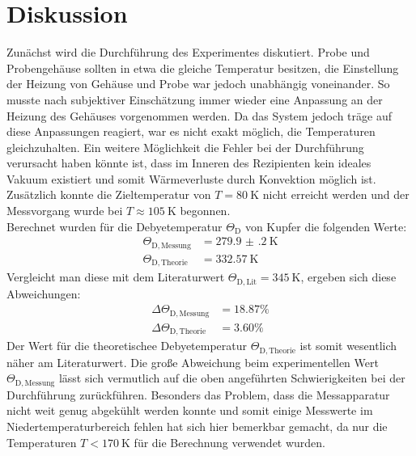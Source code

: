 \newpage
\section{Diskussion}
\label{sec:Diskussion}
Zunächst wird die Durchführung des Experimentes diskutiert. Probe und Probengehäuse sollten in etwa die gleiche Temperatur besitzen, die
Einstellung der Heizung von Gehäuse und Probe war jedoch unabhängig voneinander. So musste nach subjektiver Einschätzung immer wieder eine Anpassung an
der Heizung des Gehäuses vorgenommen werden. Da das System jedoch träge auf diese Anpassungen reagiert, war es nicht exakt möglich, die Temperaturen gleichzuhalten.
Ein weitere Möglichkeit die Fehler bei der Durchführung verursacht haben könnte ist, dass im Inneren des Rezipienten kein ideales Vakuum existiert und somit
Wärmeverluste durch Konvektion möglich ist. Zusätzlich konnte die Zieltemperatur von $T=\SI{80}{\kelvin}$ nicht erreicht werden und der Messvorgang wurde bei
$T\approx\SI{105}{\kelvin}$ begonnen. \\

\noindent Berechnet wurden für die Debyetemperatur $\Theta_\mathrm{D}$ von Kupfer die folgenden Werte:
\begin{align*}
  \Theta_\mathrm{D,Messung} &= \SI{279.9(2)}{\kelvin} \\
  \Theta_\mathrm{D,Theorie} &= \SI{332.57}{\kelvin}
\end{align*}
Vergleicht man diese mit dem Literaturwert \cite{Anleitung3} $\Theta_\mathrm{D,Lit}=\SI{345}{\kelvin}$, ergeben sich diese Abweichungen:
\begin{align*}
  \Delta\Theta_\mathrm{D,Messung} &= 18.87 \% \\
  \Delta\Theta_\mathrm{D,Theorie} &= 3.60 \%
\end{align*}
Der Wert für die theoretischee Debyetemperatur $\Theta_\mathrm{D,Theorie}$ ist somit wesentlich näher am Literaturwert. Die große Abweichung beim experimentellen Wert $\Theta_\mathrm{D,Messung}$
lässt sich vermutlich auf die oben angeführten Schwierigkeiten bei der Durchführung zurückführen. Besonders das Problem, dass die Messapparatur nicht weit genug abgekühlt werden konnte und somit einige Messwerte im Niedertemperaturbereich fehlen hat sich hier bemerkbar gemacht, da nur die Temperaturen $T<\SI{170}{\kelvin}$ für die Berechnung verwendet wurden. \\

